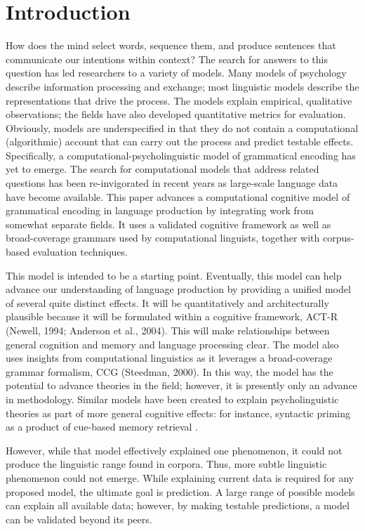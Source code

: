 \section{Introduction}
 How does the mind select words, sequence them, and produce sentences that communicate our intentions within context? The search for answers to this question has led researchers to a variety of models. Many models of psychology describe information processing and exchange; most linguistic models describe the representations that drive the process. The models explain empirical, qualitative observations; the fields have also developed quantitative metrics for evaluation. Obviously, models are underspecified in that they do not contain a computational (algorithmic) account that can carry out the process and predict testable effects. Specifically, a computational-psycholinguistic model of grammatical encoding has yet to emerge. The search for computational models that address related questions has been re-invigorated in recent years as large-scale language data have become available. This paper advances a computational cognitive model of grammatical encoding in language production by integrating work from somewhat separate fields. It uses a validated cognitive framework as well as broad-coverage grammars used by computational linguists, together with corpus-based evaluation techniques.
 
 This model is intended to be a starting point. Eventually, this model can help advance our understanding of language production by providing a unified model of several quite distinct effects. It will be quantitatively and architecturally plausible because it will be formulated within a cognitive framework, ACT-R (Newell, 1994; Anderson et al., 2004). This will make relationships between general cognition and memory and language processing clear. The model also uses insights from computational linguistics as it leverages a broad-coverage grammar formalism, CCG (Steedman, 2000). In this way, the model has the potential to advance theories in the field; however, it is presently only an advance in methodology. Similar models have been created to explain psycholinguistic theories as part of more general cognitive effects: for instance, syntactic priming as a product of cue-based memory retrieval \cite{priming-model}. 
 
However, while that model effectively explained one phenomenon, it could not produce the linguistic range found in corpora. Thus, more subtle linguistic phenomenon could not emerge. While explaining current data is required for any proposed model, the ultimate goal is prediction. A large range of possible models can explain all available data; however, by making testable predictions, a model can be validated beyond its peers.
 
